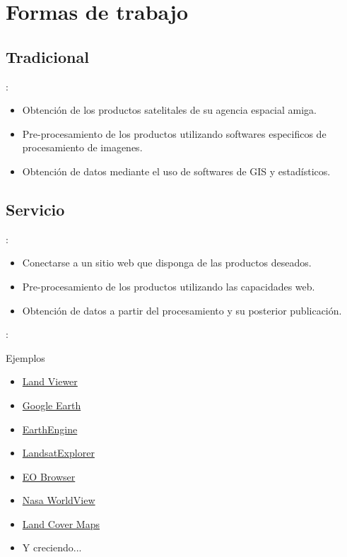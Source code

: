 \documentclass[aspectratio=169]{beamer}
\begin{document}
\section{Formas de trabajo}
\subsection{Tradicional}
\begin{frame}{\secname : \subsecname}
    \begin{itemize}[<+->]
        \item Obtención de los productos satelitales de su agencia espacial amiga.
        \item Pre-procesamiento de los productos utilizando softwares especificos de procesamiento de imagenes.
        \item Obtención de datos mediante el uso de softwares de GIS y estadísticos.
    \end{itemize}
\end{frame}

\subsection{Servicio}
\begin{frame}{\secname : \subsecname}
    \begin{itemize}[<+->]
        \item Conectarse a un sitio web que disponga de las productos deseados.
        \item Pre-procesamiento de los productos utilizando las capacidades web.
        \item Obtención de datos a partir del procesamiento y su posterior publicación.
    \end{itemize}
\end{frame}

\begin{frame}{\secname : \subsecname}
    \begin{exampleblock}{Ejemplos}
        \begin{itemize}
            \item \href{http://lv.eosda.com}{Land Viewer}
            \item \href{https://earth.google.com/web/}{Google Earth}
            \item \href{https://earthengine.google.com}{EarthEngine}
            \item \href{http://landsatexplorer.esri.com/}{LandsatExplorer}
            \item \href{http://apps.sentinel-hub.com/eo-browser/}{EO Browser}
            \item \href{https://worldview.earthdata.nasa.gov/}{Nasa WorldView}
            \item \href{http://maps.elie.ucl.ac.be/CCI/viewer/index.php}{Land Cover Maps}
            \item Y creciendo...
        \end{itemize}
    \end{exampleblock}
\end{frame}
\end{document}
